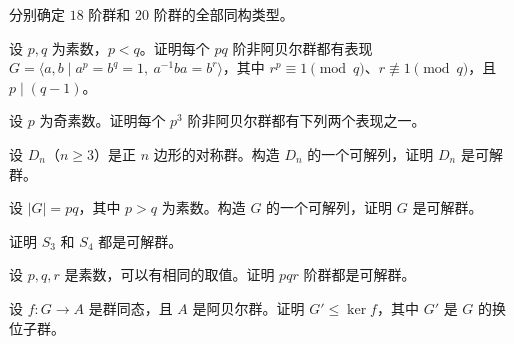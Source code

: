\newpage
\noindent\begin{minipage}{\textwidth}
分别确定 $18$ 阶群和 $20$ 阶群的全部同构类型。
\end{minipage}\par\vfill
\noindent\begin{minipage}{\textwidth}
设 $p,q$ 为素数，$p<q$。证明每个 $pq$ 阶非阿贝尔群都有表现 $G=\langle a,b\mid a^p=b^q=1,\ a^{-1}ba=b^r\rangle$，其中 $r^p\equiv1\pmod q$、$r\not\equiv1\pmod q$，且 $p\mid(q-1)$。
\end{minipage}\par\vfill
\noindent\begin{minipage}{\textwidth}
设 $p$ 为奇素数。证明每个 $p^3$ 阶非阿贝尔群都有下列两个表现之一。
\end{minipage}\par\vfill
\newpage
\noindent\begin{minipage}{\textwidth}
设 $D_n$（$n\ge3$）是正 $n$ 边形的对称群。构造 $D_n$ 的一个可解列，证明 $D_n$ 是可解群。
\end{minipage}\par\vfill
\noindent\begin{minipage}{\textwidth}
设 $|G|=pq$，其中 $p>q$ 为素数。构造 $G$ 的一个可解列，证明 $G$ 是可解群。
\end{minipage}\par\vfill
\noindent\begin{minipage}{\textwidth}
证明 $S_3$ 和 $S_4$ 都是可解群。
\end{minipage}\par\vfill
\newpage
\noindent\begin{minipage}{\textwidth}
设 $p,q,r$ 是素数，可以有相同的取值。证明 $pqr$ 阶群都是可解群。
\end{minipage}\par\vfill
\noindent\begin{minipage}{\textwidth}
设 $f:G\to A$ 是群同态，且 $A$ 是阿贝尔群。证明 $G'\le\ker f$，其中 $G'$ 是 $G$ 的换位子群。
\end{minipage}\par\vfill
